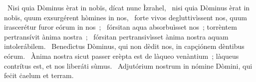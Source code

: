 \psalmChapterWithInscription{}
{ }
{%
~Nisi quia Dòminus èrat in nobïs, dícat nunc Ìzrahel, 
~nisi quia Dòminus èrat in nobïs, quum exsurgérent hòmines in nos, 
~forte vivos degluttivìssent nos, quum irascerétur furor eórum in nos~; 
~fórsitan aqua absorbuìsset nos~; torrèntem pertransívit ànima nostra~; 
~fórsitan pertransivìsset ànima nostra aquam intolerábilem. 
~Benedìctus Dòminus, qui non dèdit nos, in capçiónem dèntibus eórum. 
~Ànima nostra sicut passer erèpta est de làqueo venàntium~; làqueus contrítus est, et nos liberáti sùmus. 
~Adjutórium nostrum in nómine Dòmini, qui feċit ċaelum et terram. 
}
